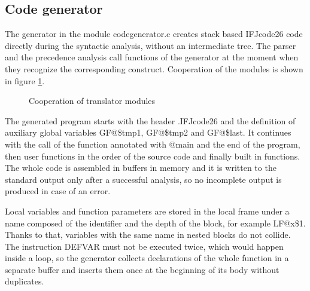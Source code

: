 \documentclass[a4paper,11pt]{article}
\begin{document}
\subsection{Code generator}

The generator in the module codegenerator.c creates stack based IFJcode26 code
directly during the syntactic analysis, without an intermediate tree. The parser and the
precedence analysis call functions of the generator at the moment when they recognize the
corresponding construct. Cooperation of the modules is shown in figure \ref{fig:arch}.

\begin{figure}[H]
  \centering
  \caption{Cooperation of translator modules}
  \label{fig:arch}
\end{figure}

The generated program starts with the header .IFJcode26 and the definition of
auxiliary global variables GF@\$tmp1, GF@\$tmp2 and
GF@\$last. It continues with the call of the function annotated with
@main and the end of the program, then user functions in the order of the source
code and finally built in functions. The whole code is assembled in buffers in memory and
it is written to the standard output only after a successful analysis, so no incomplete
output is produced in case of an error.

Local variables and function parameters are stored in the local frame under a name
composed of the identifier and the depth of the block, for example LF@x\$1.
Thanks to that, variables with the same name in nested blocks do not collide. The
instruction DEFVAR must not be executed twice, which would happen inside a loop,
so the generator collects declarations of the whole function in a separate buffer and
inserts them once at the beginning of its body without duplicates.
\end{document}
